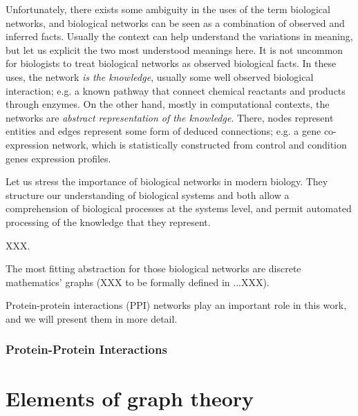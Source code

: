 		Unfortunately, there exists some ambiguity in the uses of the term biological networks, and biological networks can be seen as a combination of observed and inferred facts.
		Usually the context can help understand the variations in meaning, but let us explicit the two most understood meanings here.
		It is not uncommon for biologists to treat biological networks as observed biological facts.
		In these uses, the network \emph{is the knowledge}, usually some well observed biological interaction; e.g. a known pathway that connect chemical reactants and products through enzymes.
		On the other hand, mostly in computational contexts, the networks are \emph{abstract representation of the knowledge}.
		There, nodes represent entities and edges represent some form of deduced connections; e.g. a gene co-expression network, which is statistically constructed from control and condition genes expression profiles.

		Let us stress the importance of biological networks in modern biology.
		They structure our understanding of biological systems and both allow a comprehension of biological processes at the systems level, and permit automated processing of the knowledge that they represent.

		XXX.

		The most fitting abstraction for those biological networks are discrete mathematics' graphs (XXX to be formally defined in ...XXX).

		Protein-protein interactions (PPI) networks play an important role in this work, and we will present them in more detail.

		\subsubsection{Protein-Protein Interactions}



\section{Elements of graph theory}

